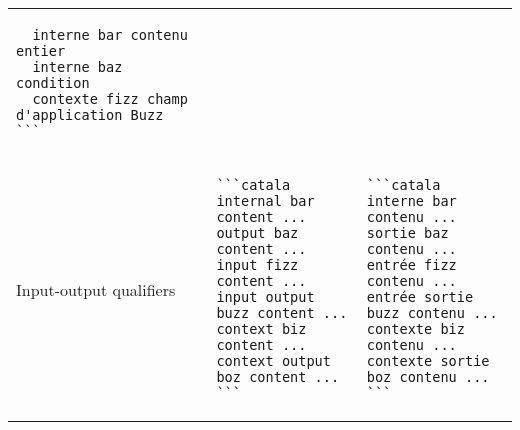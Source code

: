 \documentclass[a3paper,landscape]{article}
\begin{document}
\begin{multicols*}{2}
\begin{tabular}{p{}p{}p{}}
\begin{verbatim}
  interne bar contenu entier
  interne baz condition
  contexte fizz champ d'application Buzz
```
\end{verbatim}
    \vspace*{-1.75em}                                        \\
    Input-output qualifiers &
    \vspace*{-1.75em}
    \begin{verbatim}
```catala
internal bar content ...
output baz content ...
input fizz content ...
input output buzz content ...
context biz content ...
context output boz content ...
```
\end{verbatim}
    \vspace*{-1.75em}
                            &
    \vspace*{-1.75em}
    \begin{verbatim}
```catala
interne bar contenu ...
sortie baz contenu ...
entrée fizz contenu ...
entrée sortie buzz contenu ...
contexte biz contenu ...
contexte sortie boz contenu ...
```
\end{verbatim}
    \vspace*{-1.75em}                                        \\
    \bottomrule
  \end{tabular}












\end{multicols*}
\end{document}
